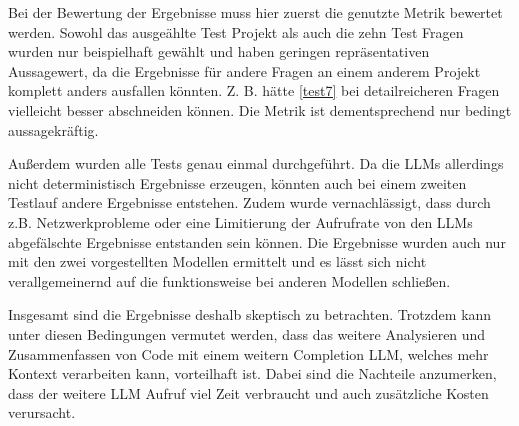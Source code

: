\documentclass[../main.tex]{subfiles}
\begin{document}
Bei der Bewertung der Ergebnisse muss hier zuerst die genutzte Metrik bewertet werden.
Sowohl das ausgeählte Test Projekt als auch die zehn Test Fragen wurden nur beispielhaft gewählt und haben geringen repräsentativen Aussagewert, da die Ergebnisse für andere Fragen an einem anderem Projekt komplett anders ausfallen könnten.
Z. B. hätte \ref{test7} bei detailreicheren Fragen vielleicht besser abschneiden können.
Die Metrik ist dementsprechend nur bedingt aussagekräftig.

Außerdem wurden alle Tests genau einmal durchgeführt. 
Da die \glspl{LLM} allerdings nicht deterministisch Ergebnisse erzeugen, könnten auch bei einem zweiten Testlauf andere Ergebnisse entstehen.
Zudem wurde vernachlässigt, dass durch z.B. Netzwerkprobleme oder eine Limitierung der Aufrufrate von den \glspl{LLM} abgefälschte Ergebnisse entstanden sein können.
Die Ergebnisse wurden auch nur mit den zwei vorgestellten Modellen ermittelt und es lässt sich nicht verallgemeinernd auf die funktionsweise bei anderen Modellen schließen.

Insgesamt sind die Ergebnisse deshalb skeptisch zu betrachten.
Trotzdem kann unter diesen Bedingungen vermutet werden, dass das weitere Analysieren und Zusammenfassen von Code mit einem weitern Completion \gls{LLM}, welches mehr Kontext verarbeiten kann, vorteilhaft ist.
Dabei sind die Nachteile anzumerken, dass der weitere \gls{LLM} Aufruf viel Zeit verbraucht und auch zusätzliche Kosten verursacht. 
\end{document}
